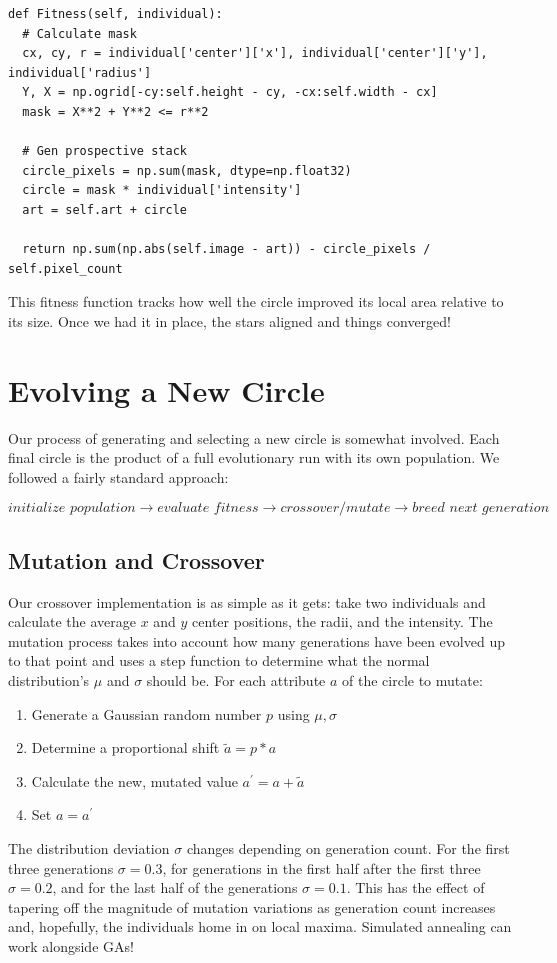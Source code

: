 \documentclass[12pt]{article}
\begin{document}
\begin{verbatim}
def Fitness(self, individual):
  # Calculate mask
  cx, cy, r = individual['center']['x'], individual['center']['y'], individual['radius']
  Y, X = np.ogrid[-cy:self.height - cy, -cx:self.width - cx]
  mask = X**2 + Y**2 <= r**2                
  
  # Gen prospective stack
  circle_pixels = np.sum(mask, dtype=np.float32)
  circle = mask * individual['intensity']
  art = self.art + circle

  return np.sum(np.abs(self.image - art)) - circle_pixels / self.pixel_count
\end{verbatim}

This fitness function tracks how well the circle improved its local area relative to its size. Once we had it in place, the stars aligned and things converged!

\section*{Evolving a New Circle}
Our process of generating and selecting a new circle is somewhat involved. Each final circle is the product of a full evolutionary run with its own population. We followed a fairly standard approach:

$$
\textit{initialize population}
\rightarrow\textit{evaluate fitness}
\rightarrow\textit{crossover/mutate}
\rightarrow\textit{breed next generation}
$$

\subsection*{Mutation and Crossover}
Our crossover implementation is as simple as it gets: take two individuals and calculate the average $x$ and $y$ center positions, the radii, and the intensity. The mutation process takes into account how many generations have been evolved up to that point and uses a step function to determine what the normal distribution's $\mu$ and $\sigma$ should be. For each attribute $a$ of the circle to mutate:

\begin{enumerate}
\item Generate a Gaussian random number $p$ using $\mu, \sigma$
\item Determine a proportional shift $\tilde{a} = p*a$
\item Calculate the new, mutated value $a^{\prime} = a + \tilde{a}$
\item Set $a = a^{\prime}$ 
\end{enumerate}
The distribution deviation $\sigma$ changes depending on generation count. For the first three generations $\sigma = 0.3$, for generations in the first half after the first three $\sigma = 0.2$, and for the last half of the generations $\sigma = 0.1$. This has the effect of tapering off the magnitude of mutation variations as generation count increases and, hopefully, the individuals home in on local maxima. Simulated annealing can work alongside GAs!
\end{document}
